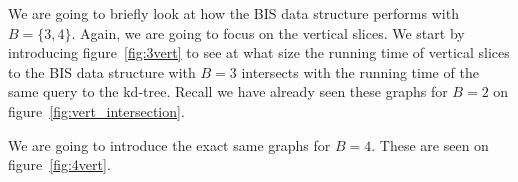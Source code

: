 We are going to briefly look at how the BIS data structure performs with $B=\{3,4\}$. Again, we are going to focus on the vertical slices. We start by introducing figure~\ref{fig:3vert} to see at what size the running time of vertical slices to the BIS data structure with $B=3$ intersects with the running time of the same query to the kd-tree. Recall we have already seen these graphs for $B=2$ on figure~\ref{fig:vert_intersection}.

We are going to introduce the exact same graphs for $B=4$. These are seen on figure~\ref{fig:4vert}.



\begin{figure}[h]
\end{figure}
